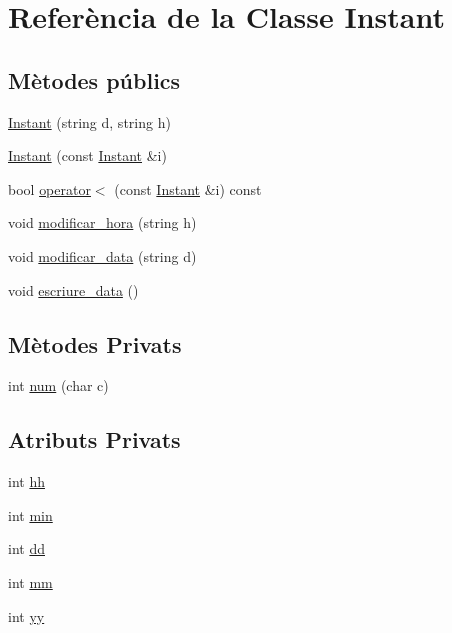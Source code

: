 \hypertarget{class_instant}{\section{Referència de la Classe Instant}
\label{class_instant}
}
\subsection*{Mètodes públics}
\begin{DoxyCompactItemize}
\item 
\hyperlink{class_instant_ad49e0d8095a5f9be466421641ca71a8b}{Instant} (string d, string h)
\item 
\hyperlink{class_instant_a2ce98e9c5d48920816a530d9aacb0f27}{Instant} (const \hyperlink{class_instant}{Instant} \&i)
\item 
bool \hyperlink{class_instant_ad3dbbdcb8f7cce6bf28bd109a4b6cbc2}{operator$<$} (const \hyperlink{class_instant}{Instant} \&i) const 
\item 
void \hyperlink{class_instant_a9f5b85dfca181715c6814b492b357c70}{modificar\-\_\-hora} (string h)
\item 
void \hyperlink{class_instant_a7db61132a491c96b02c60f6b68ead889}{modificar\-\_\-data} (string d)
\item 
void \hyperlink{class_instant_a5dc8fbbbaeb033472b6f17262b60f4a7}{escriure\-\_\-data} ()
\end{DoxyCompactItemize}
\subsection*{Mètodes Privats}
\begin{DoxyCompactItemize}
\item 
int \hyperlink{class_instant_a746f521daeb12b3b1d67d1c4ac19a4bc}{num} (char c)
\end{DoxyCompactItemize}
\subsection*{Atributs Privats}
\begin{DoxyCompactItemize}
\item 
int \hyperlink{class_instant_a56ada80c1afff9825a0003f7253795d1}{hh}
\item 
int \hyperlink{class_instant_a4de33b0ded8540ec7a903ab5763eccca}{min}
\item 
int \hyperlink{class_instant_acc6e1db1f2f2f12a87a865d6849f1b2b}{dd}
\item 
int \hyperlink{class_instant_a2912b4df6ae47c81da8f5e041ddc2266}{mm}
\item 
int \hyperlink{class_instant_a67fe547756040a8d5d9088c9827bedba}{yy}
\end{DoxyCompactItemize}


